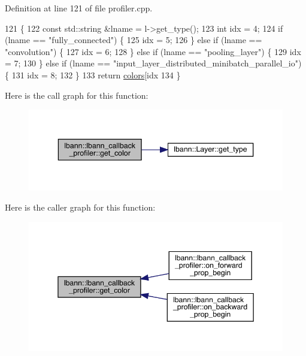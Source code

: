 Definition at line 121 of file profiler.\+cpp.


\begin{DoxyCode}
121                                                \{
122   \textcolor{keyword}{const} std::string &lname = l->get\_type();
123   \textcolor{keywordtype}{int} idx = 4;
124   \textcolor{keywordflow}{if} (lname == \textcolor{stringliteral}{"fully\_connected"}) \{
125     idx = 5;
126   \} \textcolor{keywordflow}{else} \textcolor{keywordflow}{if} (lname == \textcolor{stringliteral}{"convolution"}) \{
127     idx = 6;
128   \} \textcolor{keywordflow}{else} \textcolor{keywordflow}{if} (lname == \textcolor{stringliteral}{"pooling\_layer"}) \{
129     idx = 7;
130   \} \textcolor{keywordflow}{else} \textcolor{keywordflow}{if} (lname == \textcolor{stringliteral}{"input\_layer\_distributed\_minibatch\_parallel\_io"}) \{
131     idx = 8;
132   \}
133   \textcolor{keywordflow}{return} \hyperlink{classlbann_1_1lbann__callback__profiler_addf3323ce665956dc4988e3850bceb30}{colors}[idx %
134 \}
\end{DoxyCode}
Here is the call graph for this function\+:\nopagebreak
\begin{figure}[H]
\begin{center}
\leavevmode
\includegraphics[width=343pt]{classlbann_1_1lbann__callback__profiler_af78237a67eaacf2508f31ad72b8ff8a7_cgraph}
\end{center}
\end{figure}
Here is the caller graph for this function\+:\nopagebreak
\begin{figure}[H]
\begin{center}
\leavevmode
\includegraphics[width=345pt]{classlbann_1_1lbann__callback__profiler_af78237a67eaacf2508f31ad72b8ff8a7_icgraph}
\end{center}
\end{figure}
